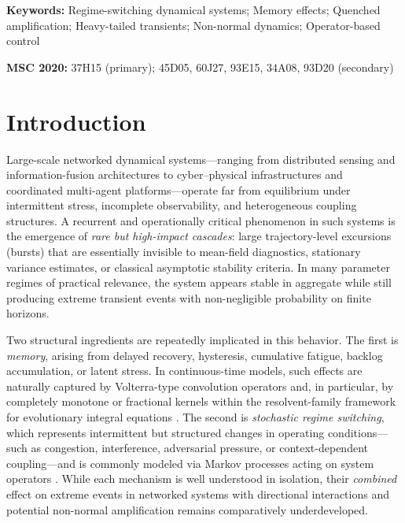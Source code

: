 \documentclass[12pt,a4paper]{article}
\theoremstyle{definition}
\theoremstyle{remark}
\begin{document}
\begin{titlepage}
\begin{center}
\vspace{0.5cm}

\noindent\textbf{Keywords:}
Regime-switching dynamical systems;
Memory effects;
Quenched amplification;
Heavy-tailed transients;
Non-normal dynamics;
Operator-based control

\vspace{0.3cm}

\noindent\textbf{MSC 2020:} 37H15 (primary); 45D05, 60J27, 93E15, 34A08, 93D20 (secondary)

\end{center}
\end{titlepage}

\tableofcontents
\newpage

\section{Introduction}

Large-scale networked dynamical systems—ranging from distributed sensing and information-fusion architectures to cyber--physical infrastructures and coordinated multi-agent platforms—operate far from equilibrium under intermittent stress, incomplete observability, and heterogeneous coupling structures. A recurrent and operationally critical phenomenon in such systems is the emergence of \emph{rare but high-impact cascades}: large trajectory-level excursions (bursts) that are essentially invisible to mean-field diagnostics, stationary variance estimates, or classical asymptotic stability criteria. In many parameter regimes of practical relevance, the system appears stable in aggregate while still producing extreme transient events with non-negligible probability on finite horizons.

Two structural ingredients are repeatedly implicated in this behavior. The first is \emph{memory}, arising from delayed recovery, hysteresis, cumulative fatigue, backlog accumulation, or latent stress. In continuous-time models, such effects are naturally captured by Volterra-type convolution operators and, in particular, by completely monotone or fractional kernels within the resolvent-family framework for evolutionary integral equations \cite{pruss1993evolution,gripenberg1990volterra,diethelm2010fractional}. The second is \emph{stochastic regime switching}, which represents intermittent but structured changes in operating conditions—such as congestion, interference, adversarial pressure, or context-dependent coupling—and is commonly modeled via Markov processes acting on system operators \cite{mao2007stochastic,yuan2010stability}. While each mechanism is well understood in isolation, their \emph{combined} effect on extreme events in networked systems with directional interactions and potential non-normal amplification remains comparatively underdeveloped.
\end{document}
